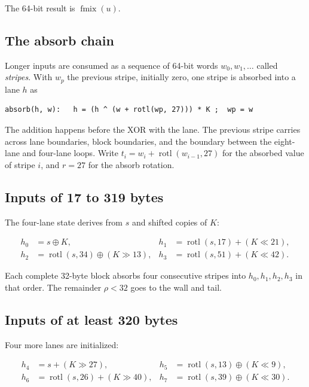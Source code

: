 \documentclass[10pt,a4paper]{article}
\theoremstyle{remark}
\newcommand{\rotl}{\operatorname{rotl}}
\newcommand{\fmix}{\operatorname{fmix}}
\begin{document}
The 64-bit result is \(\fmix(u)\).

\subsection{The absorb chain}
\label{sec:spec-absorb}

Longer inputs are consumed as a sequence of 64-bit words \(w_0, w_1, \ldots\)
called \emph{stripes}.  With \(w_p\) the previous stripe, initially zero, one
stripe is absorbed into a lane \(h\) as

\begin{lstlisting}
absorb(h, w):   h = (h ^ (w + rotl(wp, 27))) * K ;  wp = w
\end{lstlisting}

The addition happens before the XOR with the lane.  The previous stripe
carries across lane boundaries, block boundaries, and the boundary between
the eight-lane and four-lane loops.  Write \(t_i = w_i + \rotl(w_{i-1},27)\)
for the absorbed value of stripe \(i\), and \(r = 27\) for the absorb
rotation.

\subsection{Inputs of 17 to 319 bytes}
\label{sec:spec-mid}

The four-lane state derives from \(s\) and shifted copies of \(K\):

\begin{align*}
h_0 &= s \oplus K, &
h_1 &= \rotl(s,17) + (K \mathbin{\ll} 21),\\
h_2 &= \rotl(s,34) \oplus (K \mathbin{\gg} 13), &
h_3 &= \rotl(s,51) + (K \mathbin{\ll} 42).
\end{align*}

Each complete 32-byte block absorbs four consecutive stripes into
\(h_0,h_1,h_2,h_3\) in that order.  The remainder \(\rho < 32\) goes to the
wall and tail.

\subsection{Inputs of at least 320 bytes}
\label{sec:spec-bulk}

Four more lanes are initialized:

\begin{align*}
h_4 &= s + (K \mathbin{\gg} 27), &
h_5 &= \rotl(s,13) \oplus (K \mathbin{\ll} 9),\\
h_6 &= \rotl(s,26) + (K \mathbin{\gg} 40), &
h_7 &= \rotl(s,39) \oplus (K \mathbin{\ll} 30).
\end{align*}
\end{document}

